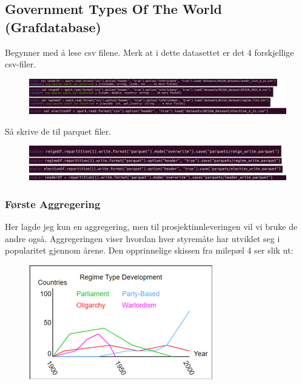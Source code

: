 \subsection{Government Types Of The World (Grafdatabase)}

Begynner med å lese csv filene. Merk at i dette datasettet er det 4 forskjellige csv-filer.

\FigureCounter
\begin{figure}[H]
    \includegraphics[width=\textwidth]{images/milepael5/graphDbImport.png}
\end{figure}

Så skrive de til parquet filer.

\FigureCounter
\begin{figure}[H]
    \includegraphics[width=\textwidth]{images/milepael5/writeGraphDb.png}
\end{figure}

\subsubsection{Første Aggregering}
Her lagde jeg kun en aggregering, men til prosjektinnleveringen vil vi bruke de andre også. Aggregeringen viser hvordan hver styremåte har utviklet seg i popularitet gjennom årene. Den opprinnelige skissen fra milepæl 4 ser slik ut:

\FigureCounter
\begin{figure}[H]
    \includegraphics[width=\textwidth]{images/milepael5/regimeTypeGraphic.png}
\end{figure}

